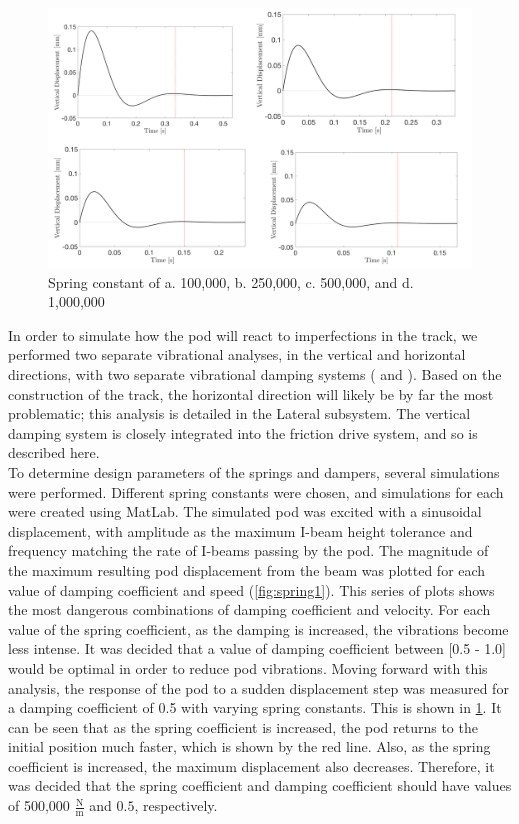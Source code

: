 \documentclass[main.tex]{subfiles}
\begin{document}
    \begin{figure}
        \centering
        \includegraphics[width=\textwidth]{images/fig2}
        \caption{Spring constant of a. 100,000, b. 250,000, c. 500,000, and d. 1,000,000}
        \label{fig:spring2}
    \end{figure}
    In order to simulate how the pod will react to imperfections in the track, we performed two separate vibrational analyses, in the vertical and horizontal directions, with two separate vibrational damping systems ( and ). Based on the construction of the track, the horizontal direction will likely be by far the most problematic; this analysis is detailed in the Lateral subsystem. The vertical damping system is closely integrated into the friction drive system, and so is described here.\\

    To determine design parameters of the springs and dampers, several simulations were performed. Different spring constants were chosen, and simulations for each were created using MatLab. The simulated pod was excited with a sinusoidal displacement, with amplitude as the maximum I-beam height tolerance and frequency matching the rate of I-beams passing by the pod. The magnitude of the maximum resulting pod displacement from the beam was plotted for each value of damping coefficient and speed (\ref{fig:spring1}). This series of plots shows the most dangerous combinations of damping coefficient and velocity. For each value of the spring coefficient, as the damping is increased, the vibrations become less intense. It was decided that a value of damping coefficient between [0.5 - 1.0] would be optimal in order to reduce pod vibrations.  Moving forward with this analysis, the response of the pod to a sudden displacement step was measured for a damping coefficient of 0.5 with varying spring constants. This is shown in \ref{fig:spring2}. It can be seen that as the spring coefficient is increased, the pod returns to the initial position much faster, which is shown by the red line. Also, as the spring coefficient is increased, the maximum displacement also decreases. Therefore, it was decided that the spring coefficient and damping coefficient should have values of 500,000 $\frac{\mathrm{N}}{\mathrm{m}}$ and $0.5$, respectively. \\
\end{document}
